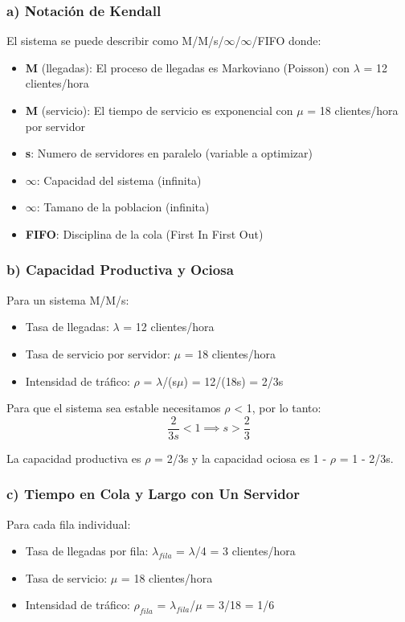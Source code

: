 \documentclass[12pt]{article}
\begin{document}
\subsubsection{a) Notación de Kendall}

El sistema se puede describir como M/M/s/$\infty$/$\infty$/FIFO donde:
\begin{itemize}
    \item \textbf{M} (llegadas): El proceso de llegadas es Markoviano (Poisson) con $\lambda$ = 12 clientes/hora
    \item \textbf{M} (servicio): El tiempo de servicio es exponencial con $\mu$ = 18 clientes/hora por servidor
    \item \textbf{s}: Numero de servidores en paralelo (variable a optimizar)
    \item \textbf{$\infty$}: Capacidad del sistema (infinita)
    \item \textbf{$\infty$}: Tamano de la poblacion (infinita)
    \item \textbf{FIFO}: Disciplina de la cola (First In First Out)
\end{itemize}

\subsubsection{b) Capacidad Productiva y Ociosa}

Para un sistema M/M/s:
\begin{itemize}
    \item Tasa de llegadas: $\lambda$ = 12 clientes/hora
    \item Tasa de servicio por servidor: $\mu$ = 18 clientes/hora
    \item Intensidad de tráfico: $\rho$ = $\lambda$/(s$\mu$) = 12/(18s) = 2/3s
\end{itemize}

Para que el sistema sea estable necesitamos $\rho$ < 1, por lo tanto:
\[
\frac{2}{3s} < 1 \implies s > \frac{2}{3}
\]

La capacidad productiva es $\rho$ = 2/3s y la capacidad ociosa es 1 - $\rho$ = 1 - 2/3s.

\subsubsection{c) Tiempo en Cola y Largo con Un Servidor}

Para cada fila individual:
\begin{itemize}
    \item Tasa de llegadas por fila: $\lambda_{fila}$ = $\lambda$/4 = 3 clientes/hora
    \item Tasa de servicio: $\mu$ = 18 clientes/hora
    \item Intensidad de tráfico: $\rho_{fila}$ = $\lambda_{fila}$/$\mu$ = 3/18 = 1/6
\end{itemize}
\end{document}
